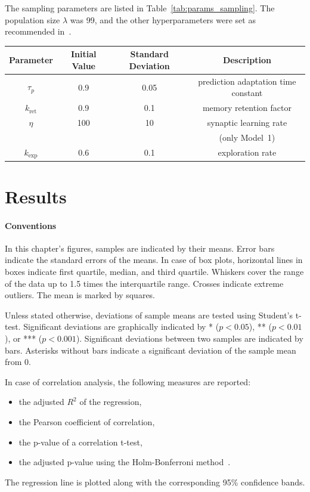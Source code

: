 \documentclass[a4paper]{scrreprt}
\begin{document}
The sampling parameters are listed in Table~\ref{tab:params_sampling}. The population size $\lambda$ was 99, and the other hyperparameters were set as recommended in~\cite{hansen11}.

\begin{center}
\begin{tabular}{ c  c  c  c }
\hline
Parameter & Initial Value & Standard Deviation & Description\\
\hline
$\tau_{p}$ & 0.9 & 0.05 & prediction adaptation time constant\\
$k_{\text{ret}}$ & 0.9 & 0.1 & memory retention factor\\
$\eta$ & 100 & 10 & synaptic learning rate\\
&&& (only Model~1)\\
$k_{\text{exp}}$ & 0.6 & 0.1 & exploration rate\\
\hline
\end{tabular}
\label{tab:params_sampling}
\end{center}







\chapter{Results}
\label{ch:results}


\subsubsection{Conventions}

In this chapter's figures, samples are indicated by their means. Error bars indicate the standard errors of the means. In case of box plots, horizontal lines in boxes indicate first quartile, median, and third quartile. Whiskers cover the range of the data up to 1.5 times the interquartile range. Crosses indicate extreme outliers. The mean is marked by squares.

Unless stated otherwise, deviations of sample means are tested using Student's t-test. Significant deviations are graphically indicated by * ($p<0.05$), ** ($p<0.01$), or *** ($p<0.001$). Significant deviations between two samples are indicated by bars. Asterisks without bars indicate a significant deviation of the sample mean from 0.

In case of correlation analysis, the following measures are reported:
\begin{itemize}
\item the adjusted $R^2$ of the regression,
\item the Pearson coefficient of correlation,
\item the p-value of a correlation t-test,
\item the adjusted p-value using the Holm-Bonferroni method~\cite{holm79}.
\end{itemize}
The regression line is plotted along with the corresponding 95\% confidence bands.
\end{document}
